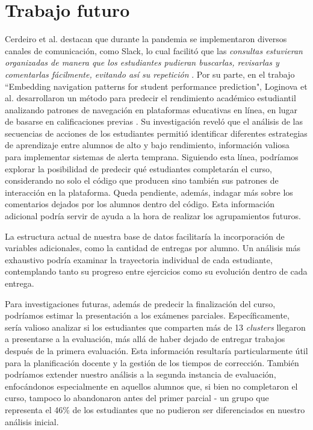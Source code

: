 \documentclass[11pt,a4paper,twoside,openany]{tesis}
\begin{document}
\chapter{Trabajo futuro }

Cerdeiro et al. destacan que durante la pandemia se implementaron diversos canales de comunicación, como Slack, lo cual facilitó que las \emph{consultas estuvieran organizadas de manera que los estudiantes pudieran buscarlas, revisarlas y comentarlas fácilmente, evitando así su repetición} \cite{unsam2020}. Por su parte, en el trabajo ``Embedding navigation patterns for student performance prediction", Loginova et al. desarrollaron un método para predecir el rendimiento académico estudiantil analizando patrones de navegación en plataformas educativas en línea, en lugar de basarse en calificaciones previas \cite{loginova2021embedding}. Su investigación reveló que el análisis de las secuencias de acciones de los estudiantes permitió identificar diferentes estrategias de aprendizaje entre alumnos de alto y bajo rendimiento, información valiosa para implementar sistemas de alerta temprana. Siguiendo esta línea, podríamos explorar la posibilidad de predecir qué estudiantes completarán el curso, considerando no solo el código que producen sino también sus patrones de interacción en la plataforma. Queda pendiente, además, indagar más sobre los comentarios dejados por los alumnos dentro del código. Esta información adicional podría servir de ayuda a la hora de realizar los agrupamientos futuros.

La estructura actual de nuestra base de datos facilitaría la incorporación de variables adicionales, como la cantidad de entregas por alumno. Un análisis más exhaustivo podría examinar la trayectoria individual de cada estudiante, contemplando tanto su progreso entre ejercicios como su evolución dentro de cada entrega.

Para investigaciones futuras, además de predecir la finalización del curso, podríamos estimar la presentación a los exámenes parciales. Específicamente, sería valioso analizar si los estudiantes que comparten más de 13 \emph{clusters} llegaron a presentarse a la evaluación, más allá de haber dejado de entregar trabajos después de la primera evaluación. Esta información resultaría particularmente útil para la planificación docente y la gestión de los tiempos de corrección. También podríamos extender nuestro análisis a la segunda instancia de evaluación, enfocándonos especialmente en aquellos alumnos que, si bien no completaron el curso, tampoco lo abandonaron antes del primer parcial - un grupo que representa el 46\% de los estudiantes que no pudieron ser diferenciados en nuestro análisis inicial.
\backmatter


\end{document}
